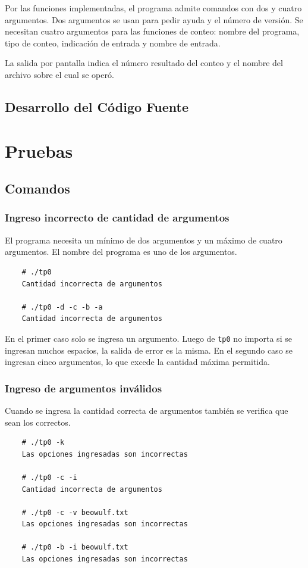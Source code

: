 \documentclass[a4paper, 10pt, twoside, notitlepage]{article}
\begin{document}
Por las funciones implementadas, el programa admite comandos con dos y cuatro argumentos. Dos argumentos se usan para pedir ayuda y el número de versión. Se necesitan cuatro argumentos para las funciones de conteo: nombre del programa, tipo de conteo, indicación de entrada y nombre de entrada.

La salida por pantalla indica el número resultado del conteo y el nombre del archivo sobre el cual se operó.

\subsection{Desarrollo del Código Fuente}


\newpage

\section{Pruebas}
\subsection{Comandos}
\subsubsection*{Ingreso incorrecto de cantidad de argumentos}
El programa necesita un mínimo de dos argumentos y un máximo de cuatro argumentos. El nombre del programa es uno de los argumentos.
\begin{verbatim}
    # ./tp0
    Cantidad incorrecta de argumentos

    # ./tp0 -d -c -b -a
    Cantidad incorrecta de argumentos
\end{verbatim}

En el primer caso solo se ingresa un argumento. Luego de \texttt{tp0} no importa si se ingresan muchos espacios, la salida de error es la misma. En el segundo caso se ingresan cinco argumentos, lo que excede la cantidad máxima permitida. 

\subsubsection*{Ingreso de argumentos inválidos}
Cuando se ingresa la cantidad correcta de argumentos también se verifica que sean los correctos.
\begin{verbatim}
    # ./tp0 -k
    Las opciones ingresadas son incorrectas
    
    # ./tp0 -c -i
    Cantidad incorrecta de argumentos

    # ./tp0 -c -v beowulf.txt
    Las opciones ingresadas son incorrectas

    # ./tp0 -b -i beowulf.txt
    Las opciones ingresadas son incorrectas
\end{verbatim}
\end{document}
